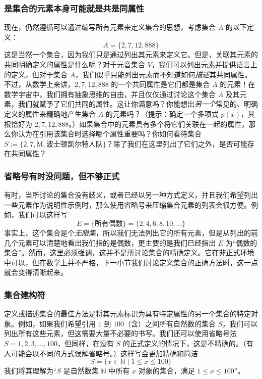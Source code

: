 \subsubsection*{是集合的元素本身可能就是共是同属性}

现在，仍然遵循可以通过编写所有元素来定义集合的思想，考虑集合 $A$ 的以下定义：
\[A=\{2, 7, 12, 888\}\]
这是当然一个集合，因为我们只是通过列出其元素来定义它。但是，关联其元素的共同明确定义的属性是什么呢？对于元音集合 $V$，我们可以列出元素并提供语言上的定义，但对于集合 $A$，我们似乎只能列出元素而不知道如何\textit{描述}其共同属性。不过，从数学上来讲，$2,7,12,888$ 的一个共同属性是它们都是集合 $A$ 的元素！在数学宇宙中，我们拥有抽象思维的自由，并且仅仅通过讨论这个集合 $A$ 及其元素，我们就赋予了它们共同的属性。这让你满意吗？你能想出\textit{另一个}常见的、明确定义的属性来精确地产生集合 $A$ 的元素吗？（提示：确定一个多项式 $p(x)$，其根恰好为 $2,7, 12, 888$。）如果集合中的元素具有多个将它们关联在一起的属性，那么你认为在引用该集合时选择哪个属性重要吗？你如何看待集合 $S := \{2, 7, \text{M}, \text{波士顿凯尔特人队}\}$？除了我们在这里列出了它们之外，是否可能存在共同属性？

\subsubsection*{省略号有时没问题，但不够正式}

有时，当所讨论的集合没有歧义，或者已经以另一种方式定义，并且我们希望列出一些元素作为说明性示例时，那么使用省略号来压缩集合元素的列表会很方便。例如，我们可以这样写
\[E = \{\text{所有偶数}\} = \{2, 4, 6, 8, 10, \dots\}\]
事实上，这个集合是个\textit{无限集}，所以我们无法列出它的所有元素，但是从列出的前几个元素可以清楚地看出我们指的是偶数，更主要的是我们已经指出 $E$ 为``偶数的集合''。然而，这里必须强调，这并不是所讨论集合的精确定义。它在非正式环境中可以，但在数学上并不严格，下一小节我们讨论定义集合的正确方法时，这一点就会变得清晰起来。

\subsubsection*{集合建构符}

定义或描述集合的最佳方法是将其元素标识为具有特定属性的另一个集合的特定对象。例如，如果我们希望引用 $1$ 到 $100$（含）之间所有自然数的集合 $S$，我们可以列出所有这些元素，但这需要大量不必要的书写。我们还可以使用省略号法 $S = {1, 2, 3, \dots , 100}$，但同样，在没有 $S$ 的正式定义的情况下，这是不精确的。（有人可能会以不同的方式误解省略号。）这样写会更加精确和简洁
\[S = \{x \in \mathbb{N} \mid 1 \le x \le 100\}\]
我们将其理解为``$S$ 是自然数集 $\mathbb{N}$ 中所有 $x$ 对象的集合，满足 $1 \le x \le 100$''。


